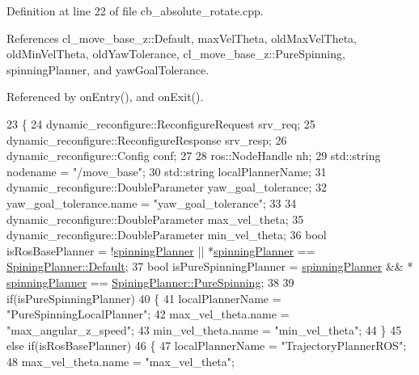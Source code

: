 Definition at line 22 of file cb\+\_\+absolute\+\_\+rotate.\+cpp.



References cl\+\_\+move\+\_\+base\+\_\+z\+::\+Default, max\+Vel\+Theta, old\+Max\+Vel\+Theta, old\+Min\+Vel\+Theta, old\+Yaw\+Tolerance, cl\+\_\+move\+\_\+base\+\_\+z\+::\+Pure\+Spinning, spinning\+Planner, and yaw\+Goal\+Tolerance.



Referenced by on\+Entry(), and on\+Exit().


\begin{DoxyCode}
23 \{
24     dynamic\_reconfigure::ReconfigureRequest srv\_req;
25     dynamic\_reconfigure::ReconfigureResponse srv\_resp;
26     dynamic\_reconfigure::Config conf;
27 
28     ros::NodeHandle nh;
29     std::string nodename = \textcolor{stringliteral}{"/move\_base"};
30     std::string localPlannerName;
31     dynamic\_reconfigure::DoubleParameter yaw\_goal\_tolerance;
32     yaw\_goal\_tolerance.name = \textcolor{stringliteral}{"yaw\_goal\_tolerance"};
33 
34     dynamic\_reconfigure::DoubleParameter max\_vel\_theta;
35     dynamic\_reconfigure::DoubleParameter min\_vel\_theta;
36     \textcolor{keywordtype}{bool} isRosBasePlanner = !\hyperlink{classcl__move__base__z_1_1CbAbsoluteRotate_a17d836524599af072cf2e3488e491a91}{spinningPlanner} || *\hyperlink{classcl__move__base__z_1_1CbAbsoluteRotate_a17d836524599af072cf2e3488e491a91}{spinningPlanner} == 
      \hyperlink{namespacecl__move__base__z_aab2ad3041275145f0065fb60b3299345a7a1920d61156abc05a60135aefe8bc67}{SpiningPlanner::Default};
37     \textcolor{keywordtype}{bool} isPureSpinningPlanner = \hyperlink{classcl__move__base__z_1_1CbAbsoluteRotate_a17d836524599af072cf2e3488e491a91}{spinningPlanner} && *
      \hyperlink{classcl__move__base__z_1_1CbAbsoluteRotate_a17d836524599af072cf2e3488e491a91}{spinningPlanner} == \hyperlink{namespacecl__move__base__z_aab2ad3041275145f0065fb60b3299345aada5274435681a4ce04175bebfa6652f}{SpiningPlanner::PureSpinning};
38 
39     \textcolor{keywordflow}{if}(isPureSpinningPlanner)
40     \{
41         localPlannerName = \textcolor{stringliteral}{"PureSpinningLocalPlanner"};
42         max\_vel\_theta.name = \textcolor{stringliteral}{"max\_angular\_z\_speed"};
43         min\_vel\_theta.name = \textcolor{stringliteral}{"min\_vel\_theta"};
44     \}
45     \textcolor{keywordflow}{else} \textcolor{keywordflow}{if}(isRosBasePlanner)
46     \{
47         localPlannerName = \textcolor{stringliteral}{"TrajectoryPlannerROS"};
48         max\_vel\_theta.name = \textcolor{stringliteral}{"max\_vel\_theta"};

\end{DoxyCode}
